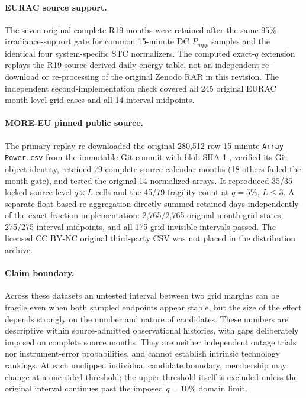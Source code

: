 \documentclass[11pt]{article}
\begin{document}
\paragraph{EURAC source support.}
The seven original complete R19 months were retained after the same 95\% irradiance-support gate for common 15-minute DC $P_{mpp}$ samples and the identical four system-specific STC normalizers. The computed exact-$q$ extension replays the R19 source-derived daily energy table, not an independent re-download or re-processing of the original Zenodo RAR in this revision. The independent second-implementation check covered all 245 original EURAC month-level grid cases and all 14 interval midpoints.

\paragraph{MORE-EU pinned public source.}
The primary replay re-downloaded the original 280,512-row 15-minute \texttt{Array Power.csv} from the immutable Git commit with blob SHA-1 \texttt{}, verified its Git object identity, retained 79 complete source-calendar months (18 others failed the month gate), and tested the original 14 normalized arrays. It reproduced 35/35 locked source-level $q\times L$ cells and the 45/79 fragility count at $q=5\%$, $L\leq3$. A separate float-based re-aggregation directly summed retained days independently of the exact-fraction implementation: 2,765/2,765 original month-grid states, 275/275 interval midpoints, and all 175 grid-invisible intervals passed. The licensed CC BY-NC original third-party CSV was not placed in the distribution archive.

\paragraph{Claim boundary.}
Across these datasets an untested interval between two grid margins can be fragile even when both sampled endpoints appear stable, but the size of the effect depends strongly on the number and nature of candidates. These numbers are descriptive within source-admitted observational histories, with gaps deliberately imposed on complete source months. They are neither independent outage trials nor instrument-error probabilities, and cannot establish intrinsic technology rankings. At each unclipped individual candidate boundary, membership may change at a one-sided threshold; the upper threshold itself is excluded unless the original interval continues past the imposed $q=10\%$ domain limit.
\end{document}
